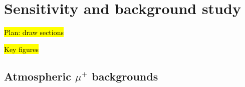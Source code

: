 \chapter{Sensitivity and background study}


\hl{Plan: draw sections}

\hl{Key figures}


\section{Atmospheric $\mu^+$ backgrounds}